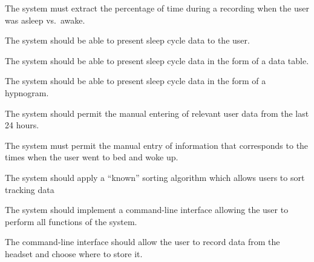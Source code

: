 \begin{reqtable}
  {The system must extract the percentage of time during a recording when the user was asleep vs.\
    awake.}
  \phigh
  \deps{\ref{sreq:calculate-moving-average}}

  {The system should be able to present sleep cycle data to the user.}
  \phigh
  \deps{\ref{sreq:present-data-table},\ref{sreq:present-hypnogram}}

  {The system should be able to present sleep cycle data in the form of a data table.}
  \phigh
  \deps{\ref{req:extract-data}}

  {The system should be able to present sleep cycle data in the form of a hypnogram.}
  \phigh
  \deps{\ref{req:extract-data}}

  {The system should permit the manual entering of relevant user data from the last 24 hours.}
  \pmed
  \deps{\ref{req:manual-entry-bed-woke}}

  {The system must permit the manual entry of information that corresponds to the times when the
    user went to bed and woke up.}
  \pmed
  \dnone

  {The system should apply a ``known'' sorting algorithm which allows users to sort tracking data}
  \pmed
  \deps{\ref{req:store-data}}
  \sspec

  {The system should implement a command-line interface allowing the user to perform all functions
    of the system.}
  \phigh
  \deps{\ref{sreq:allow-user-record-data}, \ref{sreq:specify-time-record},
    \ref{sreq:allow-user-change-format}, \ref{sreq:allow-user-extract-calculate},
    \ref{sreq:cli-sort-display}}

  {The command-line interface should allow the user to record data from the headset and choose where
    to store it.}
  \phigh
  \deps{\ref{sreq:read-data-headset}, \ref{sreq:facilitate-saving}}
  \smin{13}


\end{reqtable}
